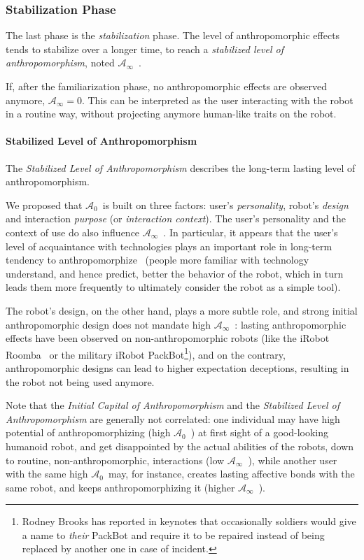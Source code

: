 \documentclass{frontiersSCNS} %
\newcommand{\ICA}{{$\mathcal{A}_0$~}}
\newcommand{\SLA}{{$\mathcal{A}_\infty$~}}
\newcommand{\sla}{{\mathcal{A}_\infty}}
\begin{document}
\subsubsection{Stabilization Phase}
\label{sec:stabilization}

The last phase is the \emph{stabilization} phase. The level of anthropomorphic
effects tends to stabilize over a longer time, to reach a \emph{stabilized
level of anthropomorphism}, noted \SLA.

If, after the familiarization phase, no anthropomorphic effects are observed
anymore, $\sla = 0$. This can be interpreted as the user interacting with the
robot in a routine way, without projecting anymore human-like traits on the
robot.


\paragraph{Stabilized Level of Anthropomorphism}

The \emph{Stabilized Level of Anthropomorphism} describes the long-term lasting level of
anthropomorphism.

We proposed that \ICA is built on three factors: user's \emph{personality},
robot's \emph{design} and interaction \emph{purpose} (or \emph{interaction
context}). The user's personality and the context of use do also influence \SLA.
In particular, it appears that the user's level of acquaintance with
technologies plays an important role in long-term tendency to
anthropomorphize~\citep{fink_living_2013} (people more familiar with technology
understand, and hence predict, better the behavior of the robot, which in turn
leads them more frequently to ultimately consider the robot as a simple tool).

The robot's design, on the other hand, plays a more subtle role, and strong
initial anthropomorphic design does not mandate high \SLA: lasting
anthropomorphic effects have been observed on non-anthropomorphic robots (like
the iRobot Roomba~\citep{fink_living_2013} or the military iRobot
PackBot\footnote{Rodney Brooks has reported in keynotes that occasionally
soldiers would give a name to \emph{their} PackBot and require it to be repaired
instead of being replaced by another one in case of incident.}), and on the
contrary, anthropomorphic designs can lead to higher expectation deceptions,
resulting in the robot not being used anymore.

Note that the \emph{Initial Capital of Anthropomorphism} and the
\emph{Stabilized Level of Anthropomorphism} are generally not correlated: one
individual may have high potential of anthropomorphizing (high \ICA) at first
sight of a good-looking humanoid robot, and get disappointed by the actual
abilities of the robots, down to routine, non-anthropomorphic, interactions (low
\SLA), while another user with the same high \ICA may, for instance, creates
lasting affective bonds with the same robot, and keeps anthropomorphizing it
(higher \SLA).
\end{document}
